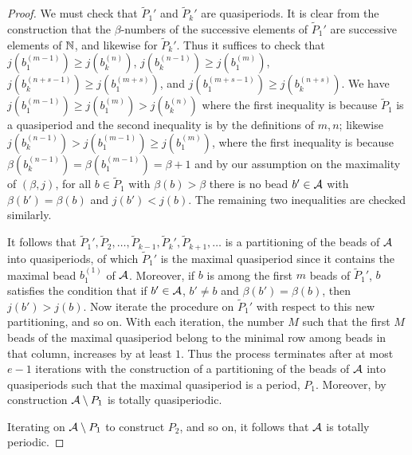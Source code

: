 \documentclass[12pt]{amsart}
\numberwithin{equation}{section}
\theoremstyle{definition}
\begin{document}
\begin{proof}
We must check that $\tilde{P}_1'$ and $\tilde{P}_k'$ are quasiperiods. It is clear from the construction that the $\beta$-numbers of the successive elements of $\tilde{P}_1'$ are successive elements of $\mathbb{N}$, and likewise for $\tilde{P}_k'$. 
Thus it suffices to check that $j(b_1^{(m-1)})\geq j(b_k^{(n)})$, $j(b_k^{(n-1)})\geq j(b_1^{(m)})$, $j(b_k^{(n+s-1)})\geq j(b_1^{(m+s)})$, and $j(b_1^{(m+s-1)})\geq j(b_k^{(n+s)})$. We have $j(b_1^{(m-1)})\geq j(b_1^{(m)})>j(b_k^{(n)})$ where the first inequality is because $\tilde{P}_1$ is a quasiperiod and the second inequality is by the definitions of $m,n$; likewise $j(b_k^{(n-1)})> j(b_1^{(m-1)})\geq j(b_1^{(m)})$, where the first inequality is because $\beta(b_k^{(n-1)})=\beta(b_1^{(m-1)})=\beta+1$ and by our assumption on the maximality of $(\beta,j)$, for all $b\in\tilde{P}_1$ with $\beta(b)>\beta$ there is no bead $b'\in\mathcal{A}$ with $\beta(b')=\beta(b)$ and $j(b')<j(b)$. The remaining two inequalities are checked similarly.

It follows that $\tilde{P}_1',\tilde{P}_2,\dots,\tilde{P}_{k-1},\tilde{P}_k',\tilde{P}_{k+1},\dots$ is a partitioning 
of the beads of $\mathcal{A}$ into quasiperiods, of which $\tilde{P}_1'$ is the maximal quasiperiod since it contains the maximal bead $b_1^{(1)}$ of $\mathcal{A}$. Moreover, if $b$ is among the first $m$ beads of $\tilde{P}_1'$, $b$ satisfies the condition that if $b'\in\mathcal{A}$, $b'\neq b$ and $\beta(b')=\beta(b)$, then $j(b')>j(b)$. Now iterate the procedure on $\tilde{P}_1'$ with respect to 
this new partitioning, and so on. With each iteration, the number $M$ such that the first $M$ beads of the maximal quasiperiod belong to the minimal row among beads in that column, increases by at least $1$. Thus the process terminates after at most $e-1$ iterations with the construction of a partitioning of the beads of $\mathcal{A}$ into quasiperiods such that the maximal quasiperiod is a period, $P_1$. Moreover, by construction $\mathcal{A}\setminus P_1$ is totally quasiperiodic.

Iterating on $\mathcal{A}\setminus P_1$ to construct $P_2$,
and so on, %
it follows that $\mathcal{A}$ is totally periodic.
\end{proof}
\end{document}
